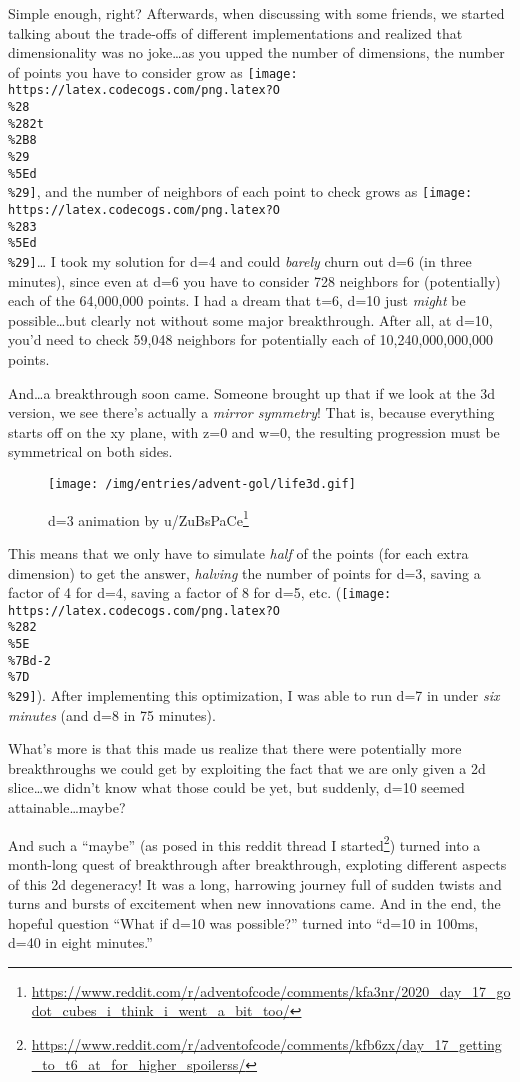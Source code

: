 \documentclass[]{article}
\renewcommand{\href}[2]{#2\footnote{\url{#1}}}
\begin{document}
Simple enough, right? Afterwards, when discussing with some friends, we started
talking about the trade-offs of different implementations and realized that
dimensionality was no joke\ldots as you upped the number of dimensions, the
number of points you have to consider grow as
\texttt{[image: https://latex.codecogs.com/png.latex?O\\\%28\\\%282t\\\%2B8\\\%29\\\%5Ed\\\%29]},
and the number of neighbors of each point to check grows as
\texttt{[image: https://latex.codecogs.com/png.latex?O\\\%283\\\%5Ed\\\%29]}\ldots{} I
took my solution for d=4 and could \emph{barely} churn out d=6 (in three
minutes), since even at d=6 you have to consider 728 neighbors for (potentially)
each of the 64,000,000 points. I had a dream that t=6, d=10 just \emph{might} be
possible\ldots but clearly not without some major breakthrough. After all, at
d=10, you'd need to check 59,048 neighbors for potentially each of
10,240,000,000,000 points.

And\ldots a breakthrough soon came. Someone brought up that if we look at the 3d
version, we see there's actually a \emph{mirror symmetry}! That is, because
everything starts off on the xy plane, with z=0 and w=0, the resulting
progression must be symmetrical on both sides.

\begin{figure}
\centering
\texttt{[image: /img/entries/advent-gol/life3d.gif]}
\caption{d=3 animation by
\href{https://www.reddit.com/r/adventofcode/comments/kfa3nr/2020_day_17_godot_cubes_i_think_i_went_a_bit_too/}{u/ZuBsPaCe}}
\end{figure}

This means that we only have to simulate \emph{half} of the points (for each
extra dimension) to get the answer, \emph{halving} the number of points for d=3,
saving a factor of 4 for d=4, saving a factor of 8 for d=5, etc.
(\texttt{[image: https://latex.codecogs.com/png.latex?O\\\%282\\\%5E\\\%7Bd-2\\\%7D\\\%29]}).
After implementing this optimization, I was able to run d=7 in under \emph{six
minutes} (and d=8 in 75 minutes).

What's more is that this made us realize that there were potentially more
breakthroughs we could get by exploiting the fact that we are only given a 2d
slice\ldots we didn't know what those could be yet, but suddenly, d=10 seemed
attainable\ldots maybe?

And such a ``maybe'' (as posed in
\href{https://www.reddit.com/r/adventofcode/comments/kfb6zx/day_17_getting_to_t6_at_for_higher_spoilerss/}{this
reddit thread I started}) turned into a month-long quest of breakthrough after
breakthrough, exploting different aspects of this 2d degeneracy! It was a long,
harrowing journey full of sudden twists and turns and bursts of excitement when
new innovations came. And in the end, the hopeful question ``What if d=10 was
possible?'' turned into ``d=10 in 100ms, d=40 in eight minutes.''
\end{document}
